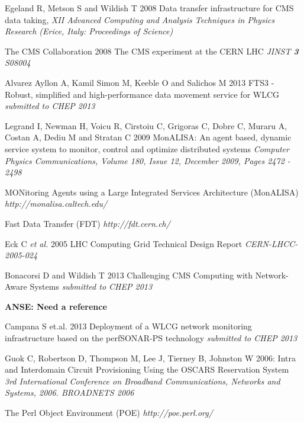 \begin{thebibliography}{1}

 Egeland R, Metson S and Wildish T 2008 Data transfer infrastructure for CMS data taking,  {\it XII Advanced Computing and Analysis Techniques in Physics Research (Erice, Italy: Proceedings of Science)}

 The CMS Collaboration 2008 The CMS experiment at the CERN LHC {\it JINST {\bf 3} S08004}

 Alvarez Ayllon A, Kamil Simon M, Keeble O and Salichos M 2013 FTS3 - Robust, simplified and high-performance data movement service for WLCG {\it submitted to CHEP 2013}

 Legrand I, Newman H, Voicu R, Cirstoiu C, Grigoras C, Dobre C, Muraru A, Costan A, Dediu M and Stratan C 2009 MonALISA: An agent based, dynamic service system to monitor, control and optimize distributed systems {\it Computer Physics Communications, Volume 180, Issue 12, December 2009, Pages 2472 - 2498}

 MONitoring Agents using a Large Integrated Services Architecture (MonALISA) {\it http://monalisa.caltech.edu/}
 
 Fast Data Transfer (FDT) {\it http://fdt.cern.ch/}
 
 Eck C {\it et al.} 2005 LHC Computing Grid Technical Design Report {\it CERN-LHCC-2005-024}

 Bonacorsi D and Wildish T 2013 Challenging CMS Computing with Network-Aware Systems {\it submitted to CHEP 2013}

 \textbf{ANSE: Need a reference}

  Campana S et.al. 2013 Deployment of a WLCG network monitoring infrastructure based on the perfSONAR-PS technology {\it submitted to CHEP 2013}

  Guok C, Robertson D, Thompson M, Lee J, Tierney B, Johnston W 2006: Intra and Interdomain Circuit Provisioning Using the OSCARS Reservation System {\it 3rd International Conference on Broadband Communications, Networks and Systems, 2006. BROADNETS 2006}

 The Perl Object Environment (POE) {\it http://poe.perl.org/}


\end{thebibliography}

